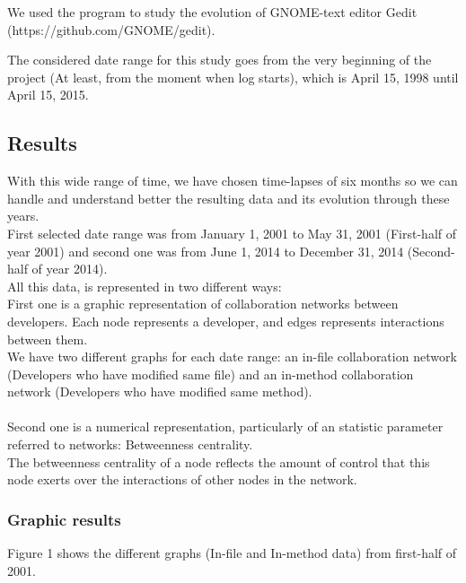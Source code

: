 \documentclass[a4paper]{article}
\begin{document}
We used the program to study the evolution of GNOME-text editor Gedit (https://github.com/GNOME/gedit).

The considered date range for this study goes from the very beginning of
the project (At least, from the moment when log starts), which is April
15, 1998 until April 15, 2015.

\subsection{Results}

With this wide range of time, we have chosen time-lapses of six months so
we can handle and understand better the resulting data and its evolution
through these years.\\
First selected date range was from January 1, 2001 to May 31, 2001 
(First-half of year 2001) and second one was from June 1, 2014 to December
31, 2014 (Second-half of year 2014).\\

All this data, is represented in two different ways:\\
First one is a graphic representation of collaboration networks between
developers. Each node represents a developer, and edges represents
interactions between them.\\
We have two different graphs for each date range: an in-file collaboration
network (Developers who have modified same file) and an in-method
collaboration network (Developers who have modified same method).\\
\\
Second one is a numerical representation, particularly of an statistic
parameter referred to networks: Betweenness centrality.\\
The betweenness centrality of a node reflects the amount of control that
this node exerts over the interactions of other nodes in the network.\\

\subsubsection{Graphic results}

Figure 1 shows the different graphs (In-file and In-method data) from
first-half of 2001.
\end{document}
